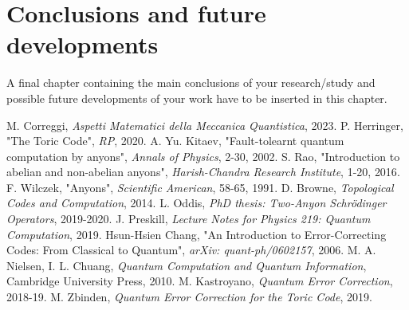 \documentclass{Configuration_Files/PoliMi3i_thesis}
\begin{document}



























\chapter{Conclusions and future developments}
\label{ch:conclusions}%
A final chapter containing the main conclusions of your research/study
and possible future developments of your work have to be inserted in this chapter.


\begin{thebibliography}{99} %
	 M. Correggi, \textit{Aspetti Matematici della Meccanica Quantistica}, 2023.
	 P. Herringer, "The Toric Code", {\it RP}, 2020.
	 A. Yu. Kitaev, "Fault-tolearnt quantum computation by anyons", {\it Annals of Physics}, 2-30, 2002.
	 S. Rao, "Introduction to abelian and non-abelian anyons", {\it Harish-Chandra Research Institute}, 1-20, {2016}.
	 F. Wilczek, "Anyons", {\it Scientific American}, 58-65, 1991.
	 D. Browne, {\it Topological Codes and Computation}, 2014.
	 L. Oddis, {\it PhD thesis: Two-Anyon Schrödinger Operators}, 2019-2020.
	 J. Preskill, {\it Lecture Notes for Physics 219:
	 Quantum Computation}, 2019.
	 Hsun-Hsien Chang, "An Introduction to Error-Correcting Codes: From Classical to Quantum", {\it arXiv: quant-ph/0602157}, 2006.
	 M. A. Nielsen, I. L. Chuang, {\it Quantum Computation and Quantum Information}, Cambridge University Press, 2010.
	 M. Kastroyano, {\it Quantum Error Correction}, 2018-19.
	 M. Zbinden, {\it Quantum Error Correction for the Toric Code}, 2019.
\end{thebibliography}
\end{document}
